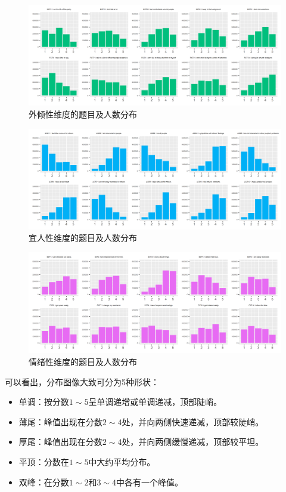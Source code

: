 \documentclass[UTF8]{ctexart}
\begin{document}
\begin{figure}[H]
  \centering
  \includegraphics[scale=0.478]{EXT.png}
  \caption{外倾性维度的题目及人数分布}
\end{figure}
\begin{figure}[H]
  \centering
  \includegraphics[scale=0.478]{AGR.png}
  \caption{宜人性维度的题目及人数分布}
\end{figure}
\begin{figure}[H]
  \centering
  \includegraphics[scale=0.478]{EST.png}
  \caption{情绪性维度的题目及人数分布}
\end{figure}
可以看出，分布图像大致可分为5种形状：
\begin{itemize}
  \item 单调：按分数$1\sim5$呈单调递增或单调递减，顶部陡峭。
  \item 薄尾：峰值出现在分数$2\sim4$处，并向两侧快速递减，顶部较陡峭。
  \item 厚尾：峰值出现在分数$2\sim4$处，并向两侧缓慢递减，顶部较平坦。
  \item 平顶：分数在$1\sim5$中大约平均分布。
  \item 双峰：在分数$1\sim2$和$3\sim4$中各有一个峰值。
\end{itemize}\par
\end{document}
